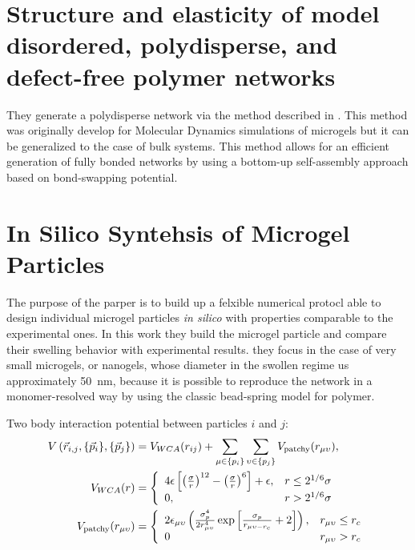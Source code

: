 \documentclass[main.tex]{subfiles}
\begin{document}
	
\section{Structure and elasticity of model disordered, polydisperse, and defect-free polymer networks \citet{colomboStressLocalizationStiffening2014}}

They generate a polydisperse network via the method described in \citet{gnanSilicoSynthesisMicrogel2017}.
This method was originally develop for Molecular Dynamics simulations of microgels but it can be generalized to the case of bulk systems.
This method allows for an efficient generation of fully bonded networks by using a bottom-up self-assembly approach based on bond-swapping potential.

\section{In Silico Syntehsis of Microgel Particles\citet{gnanSilicoSynthesisMicrogel2017}}
The purpose of the parper is to build up a felxible numerical protocl able to design individual microgel particles \textit{in silico} with properties comparable to the experimental ones.
In this work they build the microgel particle and compare their swelling behavior with experimental results.
they focus in the case of very small microgels, or nanogels, whose diameter in the swollen regime us approximately \SI{50}{\nano\meter}, because it is possible to reproduce the network in a monomer-resolved way by using the classic bead-spring model for polymer.

Two body interaction potential between particles $i$ and $j$:
\begin{align}
	V\left(\vec{r}_{i,j},\{\vec{p}_{i}\},\{\vec{p}_j\}\right) &= V_{WCA}\qty(r_{ij})+\sum_{\mu\in\{p_i\}}\sum_{\upsilon\in\{p_j\}}V_{\mathrm{patchy}}\qty(r_{\mu\upsilon}), \\
	V_{WCA}(r) &=\left\{
	\begin{array}{ll}
		4\epsilon\left[\left(\frac{\sigma}{r}\right)^{12}-\left(\frac{\sigma}{r}\right)^{6}\right]+\epsilon, & r\leq2^{1/6}\sigma \\
		0, & r>2^{1/6}\sigma
	\end{array}
	\right.
	\\
	V_{\mathrm{patchy}}(r_{\mu\upsilon}) &= \left\{
	\begin{array}{ll}
		2 \epsilon_{\mu\upsilon}\left(\frac{\sigma_p^4}{2r_{\mu\upsilon}^4}\exp\left[\frac{\sigma_p}{r_{\mu\upsilon-r_c}}+2\right] \right), & r_{\mu\upsilon}\leq r_c \\
		0 & r_{\mu\upsilon}> r_c 
	\end{array}
	\right.
\end{align}
\end{document}

